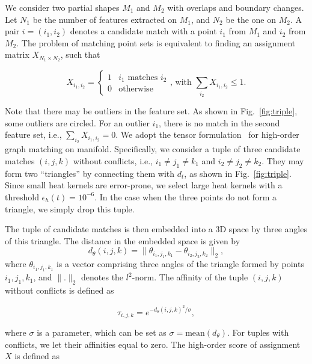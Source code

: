 We consider two partial shapes $M_{1}$ and $M_{2}$ with overlaps and boundary changes. Let $N_{1}$ be the number of features extracted on $M_{1}$, and $N_{2}$ be the one on $M_{2}$. A pair $i=(i_{1},i_{2})$ denotes a candidate match with a point $i_{1}$ from $M_{1}$ and $i_{2}$ from $M_{2}$. The problem of matching point sets is equivalent to finding an assignment matrix $X_{N_{1}\times N_{2}}$, such that

\begin{equation}
\label{eq:X}
X_{i_{1},i_{2}}=
\begin{cases}
1 & \mbox{$i_{1}$ matches $i_{2}$} \\
0 & \mbox{otherwise}
\end{cases}  \mbox{, with }\sum_{i_{2}}X_{i_{1},i_{2}} \leq 1.
\end{equation}

Note that there may be outliers in the feature set. As shown in Fig.~\ref{fig:triple}, some outliers are circled. For an outlier $i_1$, there is no match in the second feature set, i.e., $\sum_{i_{2}}X_{i_{1},i_{2}}=0$. We adopt the tensor formulation~\cite{Duchenne:CVPR:2011} for high-order graph matching on manifold. Specifically, we consider a tuple of three candidate matches $(i,j,k)$ without conflicts, i.e., $i_{1}\neq j_{1}\neq k_{1}$ and $i_{2}\neq j_{2}\neq k_{2}$. They may form two ``triangles'' by connecting them with $d_t$, as shown in Fig.~\ref{fig:triple}. Since small heat kernels are error-prone, we select large heat kernels with a threshold $\epsilon_h(t)=10^{-6}$. In the case when the three points do not form a triangle, we simply drop this tuple.

The tuple of candidate matches is then embedded into a 3D space by three angles of this triangle. The distance in the embedded space is given by
\begin{equation}
d_{\theta}(i,j,k)=\|\theta_{i_{1},j_{1},k_{1}}-\theta_{i_{2},j_{2},k_{2}}\|_{2},
\end{equation}
where $\theta_{i_{1},j_{1},k_{1}}$ is a vector comprising three angles of the triangle formed by points $i_{1},j_{1},k_{1}$, and $\|.\|_{2}$ denotes the $l^{2}$-norm. The affinity of the tuple $(i,j,k)$ without conflicts is defined as

\begin{equation}
\label{eq:entry}
\tau_{i,j,k}=e^{-d_{\theta}(i,j,k)^{2}/\sigma},
\end{equation}

where $\sigma$ is a parameter, which can be set as $\sigma=\mathrm{mean} (d_{\theta})$. For tuples with conflicts, we let their affinities equal to zero. The high-order score of assignment $X$ is defined as

